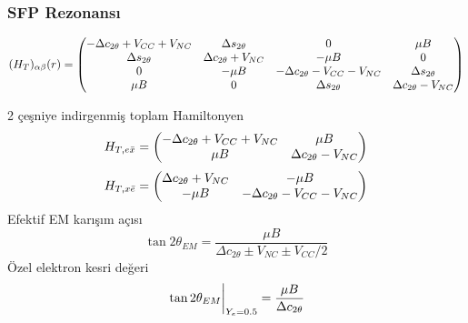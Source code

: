 \documentclass[10pt]{beamer}
\begin{document}
\begin{frame}
    \frametitle{SFP Rezonansı}
    \hrulefill
    
    \tiny
    \begin{equation*}
        (H_{T})_{\alpha\beta}(r) = \mqty(-\Delta c_{2\theta}+V_{CC}+V_{NC} & \Delta s_{2\theta} & 0 & \mu B\\\Delta s_{2\theta} & \Delta c_{2\theta} + V_{NC}& -\mu B & 0
        \\0 & -\mu B& -\Delta c_{2\theta}-V_{CC}-V_{NC} & \Delta s_{2\theta}\\ \mu B& 0 & \Delta s_{2\theta} & \Delta c_{2\theta}-V_{NC} )
    \end{equation*}
    \normalsize
    
    \hrulefill

    \begin{minipage}{0.45\textwidth}
        \footnotesize
        2 çeşniye indirgenmiş toplam Hamiltonyen
        \tiny
        \begin{equation*}
            H_{T,e\bar{x}} = \mqty(-\Delta c_{2\theta}+V_{CC}+V_{NC} & \mu B \\ \mu B & \Delta c_{2\theta}-V_{NC})
        \end{equation*}
        \begin{equation*}
	        H_{T,x\bar{e}} = \mqty(\Delta c_{2\theta}+V_{NC} & -\mu B \\ -\mu B & -\Delta c_{2\theta}-V_{CC}-V_{NC})
        \end{equation*}
        \footnotesize
        Efektif EM karışım açısı
        \begin{equation*}
            \tan 2\theta_{EM} = \frac{\mu B}{\Delta c_{2\theta} \pm V_{NC} \pm V_{CC}/2}
        \end{equation*}
        Özel elektron kesri değeri
        \begin{equation*}
            \eval{\tan 2\theta_{EM}}_{Y_{e}=0.5} = \frac{\mu B}{\Delta c_{2\theta}}
        \end{equation*}
        \normalsize
    \end{minipage}
    \hfill
    \begin{minipage}{0.45\textwidth}
        
    \end{minipage}
\end{frame}
\end{document}
